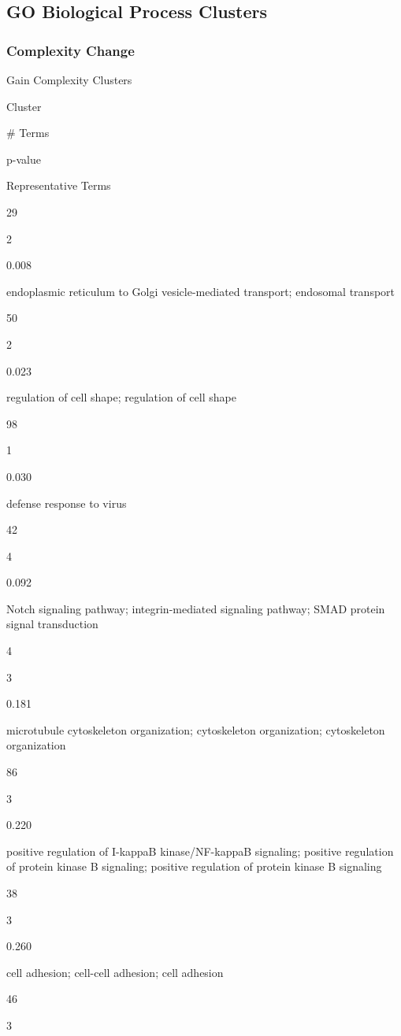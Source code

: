 \documentclass[
  letterpaper,
  DIV=11,
  numbers=noendperiod,
  openany,
  oneside]{scrreprt}
\begin{document}
\subsection{GO Biological Process Clusters}

\subsubsection{Complexity Change}

Gain Complexity Clusters

Cluster

\# Terms

p-value

Representative Terms

29

2

0.008

endoplasmic reticulum to Golgi vesicle-mediated transport; endosomal
transport

50

2

0.023

regulation of cell shape; regulation of cell shape

98

1

0.030

defense response to virus

42

4

0.092

Notch signaling pathway; integrin-mediated signaling pathway; SMAD
protein signal transduction

4

3

0.181

microtubule cytoskeleton organization; cytoskeleton organization;
cytoskeleton organization

86

3

0.220

positive regulation of I-kappaB kinase/NF-kappaB signaling; positive
regulation of protein kinase B signaling; positive regulation of protein
kinase B signaling

38

3

0.260

cell adhesion; cell-cell adhesion; cell adhesion

46

3
\end{document}
